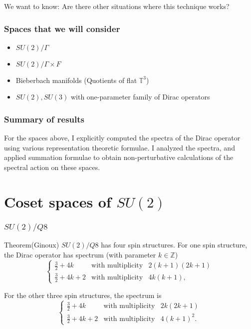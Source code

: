 \documentclass{beamer}
\def\Z{{\mathbb Z}}
\begin{document}
\begin{frame}
  \begin{block}{}
  We want to know: Are there other situations where this technique works?
  \end{block}
\end{frame}

\begin{frame}
  \frametitle{Spaces that we will consider}
  \begin{itemize}
    \item $SU(2)/\Gamma$
    \item $SU(2)/\Gamma \times F$
    \item Bieberbach manifolds (Quotients of flat $\mathbb{T} ^3$)
    \item $SU(2), SU(3)$ with one-parameter family of Dirac operators
  \end{itemize}
\end{frame}

\begin{frame}
	\frametitle{Summary of results}
For the spaces above, I explicitly computed the spectra of the Dirac operator using various representation theoretic formulae. I analyzed the spectra, and applied summation formulae to obtain non-perturbative calculations of the spectral action on these spaces.
\end{frame}

\section{Coset spaces of $SU(2)$}

\begin{frame}
	\frametitle{$SU(2)/Q8$}
	\begin{block}{Theorem(Ginoux)}
	$SU(2)/Q8$ has four spin structures. For one spin structure, the Dirac operator has spectrum (with parameter $k \in \Z$)
	\[
	\left\{ \begin{array}{lll}
\frac{3}{2} + 4k & \text{with multiplicity} & 2(k+1)(2k+1) \\[2mm]
\frac{3}{2} + 4k +2 & \text{with multiplicity} & 4k(k+1),
\end{array}\right.
	\]
	
	For the other three spin structures, the spectrum is
	\[
\left\{ \begin{array}{lll}
\frac{3}{2} + 4k & \text{with multiplicity} & 2k(2k+1) \\[2mm]
\frac{3}{2} + 4k +2 & \text{with multiplicity} & 4(k+1)^2.
\end{array}\right.
	\]
	\end{block}
\end{frame}
\end{document}
